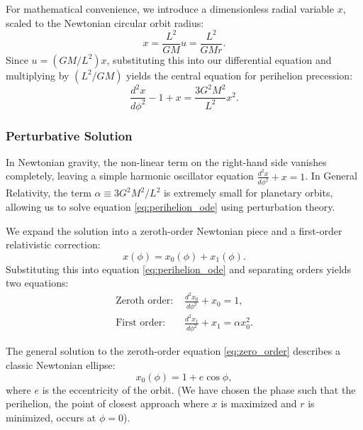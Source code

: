 \documentclass[11pt, a4paper]{report}
\begin{document}
For mathematical convenience, we introduce a dimensionless radial variable $x$, scaled to the Newtonian circular orbit radius:
\begin{equation}
x = \frac{L^{2}}{GM}u = \frac{L^{2}}{GMr}.
\end{equation}
Since $u = (GM/L^{2})x$, substituting this into our differential equation and multiplying by $(L^{2}/GM)$ yields the central equation for perihelion precession:
\begin{equation}
\label{eq:perihelion_ode}
\frac{d^{2}x}{d\phi^{2}} - 1 + x = \frac{3G^{2}M^{2}}{L^{2}}x^{2}.
\end{equation}

\subsubsection*{Perturbative Solution}
In Newtonian gravity, the non-linear term on the right-hand side vanishes completely, leaving a simple harmonic oscillator equation $\frac{d^{2}x}{d\phi^{2}} + x = 1$. In General Relativity, the term $\alpha \equiv 3G^{2}M^{2}/L^{2}$ is extremely small for planetary orbits, allowing us to solve equation \eqref{eq:perihelion_ode} using perturbation theory.

We expand the solution into a zeroth-order Newtonian piece and a first-order relativistic correction:
\begin{equation}
x(\phi) = x_{0}(\phi) + x_{1}(\phi).
\end{equation}
Substituting this into equation \eqref{eq:perihelion_ode} and separating orders yields two equations:
\begin{align}
\text{Zeroth order: } & \frac{d^{2}x_{0}}{d\phi^{2}} + x_{0} = 1, \label{eq:zero_order} \\
\text{First order: } & \frac{d^{2}x_{1}}{d\phi^{2}} + x_{1} = \alpha x_{0}^{2}. \label{eq:first_order}
\end{align}

The general solution to the zeroth-order equation \eqref{eq:zero_order} describes a classic Newtonian ellipse:
\begin{equation}
\label{eq:x0_solution}
x_{0}(\phi) = 1 + e \cos\phi,
\end{equation}
where $e$ is the eccentricity of the orbit. (We have chosen the phase such that the perihelion, the point of closest approach where $x$ is maximized and $r$ is minimized, occurs at $\phi = 0$).
\end{document}
